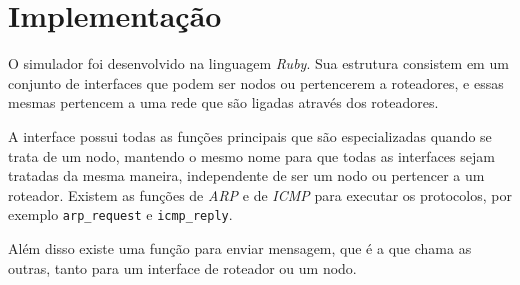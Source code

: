 \section{Implementação}
\label{sec:imp}


O simulador foi desenvolvido na linguagem \emph{Ruby}. Sua estrutura
consistem em um conjunto de interfaces que podem ser nodos ou
pertencerem a roteadores, e essas mesmas pertencem a uma rede que são
ligadas através dos roteadores.

A interface possui todas as funções principais que são especializadas
quando se trata de um nodo, mantendo o mesmo nome para que todas as
interfaces sejam tratadas da mesma maneira, independente de ser um nodo
ou pertencer a um roteador. Existem as funções de \emph{ARP} e de
\emph{ICMP} para executar os protocolos, por exemplo \verb!arp_request!
e \verb!icmp_reply!.

Além disso existe uma função para enviar mensagem, que é a que chama as
outras, tanto para um interface de roteador ou um nodo.


